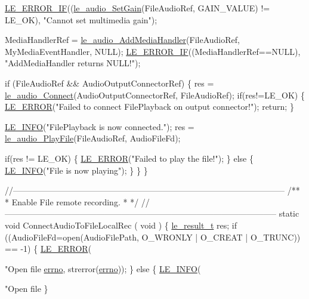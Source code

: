 \begin{DoxyCodeInclude}
{{{{{{{    \hyperlink{le__log_8h_aceaf11a11691d6c676e36dd317b38dbd}{LE\_ERROR\_IF}((\hyperlink{le__audio__interface_8h_a65f11540e6af03a3494b6b9be76ba5fc}{le\_audio\_SetGain}(FileAudioRef, GAIN\_VALUE) != LE\_OK), \textcolor{stringliteral}{"Cannot
       set multimedia gain"});

    MediaHandlerRef = \hyperlink{le__audio__interface_8h_a9996ac9d23333cf8219f28b69cac4f81}{le\_audio\_AddMediaHandler}(FileAudioRef, MyMediaEventHandler, 
      NULL);
    \hyperlink{le__log_8h_aceaf11a11691d6c676e36dd317b38dbd}{LE\_ERROR\_IF}((MediaHandlerRef==NULL), \textcolor{stringliteral}{"AddMediaHandler returns NULL!"});

    \textcolor{keywordflow}{if} (FileAudioRef && AudioOutputConnectorRef)
    \{
        res = \hyperlink{le__audio__interface_8h_a338df65b2fb1ae0140d86880adbcf0de}{le\_audio\_Connect}(AudioOutputConnectorRef, FileAudioRef);
        \textcolor{keywordflow}{if}(res!=LE\_OK)
        \{
            \hyperlink{le__log_8h_a353590f91b3143a7ba3a416ae5a50c3d}{LE\_ERROR}(\textcolor{stringliteral}{"Failed to connect FilePlayback on output connector!"});
            \textcolor{keywordflow}{return};
        \}

        \hyperlink{le__log_8h_a23e6d206faa64f612045d688cdde5808}{LE\_INFO}(\textcolor{stringliteral}{"FilePlayback is now connected."});
        res = \hyperlink{le__audio__interface_8h_aea2c5d0b394cfab87503639c534300c9}{le\_audio\_PlayFile}(FileAudioRef, AudioFileFd);

        \textcolor{keywordflow}{if}(res != LE\_OK)
        \{
            \hyperlink{le__log_8h_a353590f91b3143a7ba3a416ae5a50c3d}{LE\_ERROR}(\textcolor{stringliteral}{"Failed to play the file!"});
        \}
        \textcolor{keywordflow}{else}
        \{
            \hyperlink{le__log_8h_a23e6d206faa64f612045d688cdde5808}{LE\_INFO}(\textcolor{stringliteral}{"File is now playing"});
        \}
    \}
\}

\textcolor{comment}{//--------------------------------------------------------------------------------------------------}\textcolor{comment}{}
\textcolor{comment}{/**}
\textcolor{comment}{ * Enable File remote recording.}
\textcolor{comment}{ *}
\textcolor{comment}{ */}
\textcolor{comment}{//--------------------------------------------------------------------------------------------------}
\textcolor{keyword}{static} \textcolor{keywordtype}{void} ConnectAudioToFileLocalRec
(
    \textcolor{keywordtype}{void}
)
\{
    \hyperlink{le__basics_8h_a1cca095ed6ebab24b57a636382a6c86c}{le\_result\_t} res;
    \textcolor{keywordflow}{if} ((AudioFileFd=open(AudioFilePath, O\_WRONLY | O\_CREAT | O\_TRUNC)) == -1)
    \{
        \hyperlink{le__log_8h_a353590f91b3143a7ba3a416ae5a50c3d}{LE\_ERROR}(\textcolor{stringliteral}{"Open file %
      \hyperlink{supervisor_8c_a0a4ccfdbe1cf7b37afc60d34e748b066}{errno}, strerror(\hyperlink{supervisor_8c_a0a4ccfdbe1cf7b37afc60d34e748b066}{errno}));
    \}
    \textcolor{keywordflow}{else}
    \{
        \hyperlink{le__log_8h_a23e6d206faa64f612045d688cdde5808}{LE\_INFO}(\textcolor{stringliteral}{"Open file %
    \}

}}}}}}}}}
\end{DoxyCodeInclude}
